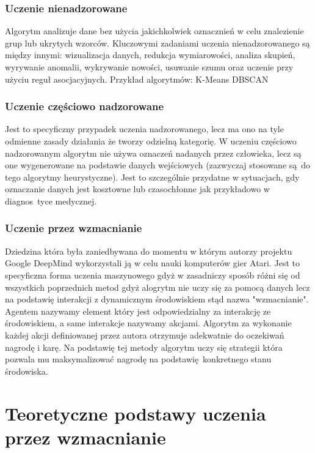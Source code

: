 \documentclass[a4paper, 12pt]{article}
\begin{document}
    \subsubsection{Uczenie nienadzorowane}
    Algorytm analizuje dane bez użycia jakichkolwiek oznacznień w celu znalezienie grup lub ukrytych wzorców.
    Kluczowymi zadaniami uczenia nienadzorowanego są między innymi: wizualizacja danych,
    redukcja wymiarowości, analiza skupień, wyrywanie anomalii, wykrywanie nowości, usuwanie szumu
    oraz uczenie przy użyciu reguł asocjacyjnych. Przykład algorytmów: K-Means DBSCAN

    \subsubsection{Uczenie częściowo nadzorowane}
    Jest to specyficzny przypadek uczenia nadzorowanego, lecz ma ono na tyle odmienne zasady działania że tworzy
    odzielną kategorię. W uczeniu częściowo nadzorowanym algorytm nie używa oznaczeń nadanych przez człowieka, lecz są one 
    wygenerowane na podstawie danych wejściowych (zazwyczaj stosowane są do tego algorytmy heurystyczne).
    Jest to szczególnie przydatne w sytuacjach, gdy oznaczanie danych jest kosztowne lub czasochłonne jak przykładowo
    w diagnos~tyce medycznej. 

    \subsubsection{Uczenie przez wzmacnianie}
    Dziedzina która była zaniedbywana do momentu w którym autorzy projektu Google DeepMind wykorzystali ją w celu nauki komputerów 
    gier Atari. Jest to specyficzna forma uczenia maszynowego gdyż w zasadniczy sposób różni się od wszystkich poprzednich metod gdyż
    alogrytm nie uczy się za pomocą danych lecz na podstawię interakcji z dynamicznym środowiskiem stąd nazwa "wzmacnianie". 
    Agentem nazywamy element który jest odpowiedzialny za interakcję ze środowiskiem, a same interakcje nazywamy akcjami.
    Algorytm za wykonanie każdej akcji definiowanej przez autora otrzymuje adekwatnie do oczekiwań nagrodę i karę. Na podstawię 
    tej metody algorytm uczy się strategii która pozwala mu maksymalizować nagrodę na podstawię konkretnego stanu środowiska.
    
    \section{Teoretyczne podstawy uczenia przez wzmacnianie}
\end{document}

